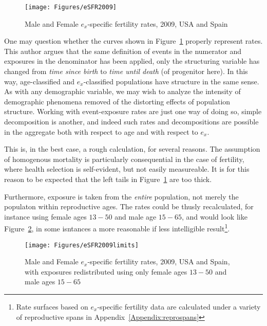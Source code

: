 \begin{figure}[ht!]
        \centering  
          \caption{Male and Female $e_x$-specific fertility rates, 2009, USA and
          Spain}
           \texttt{[image: Figures/eSFR2009]}
          \label{fig:eSFR2009}
\end{figure}

One may question whether the curves shown in Figure~\ref{fig:eSFR2009} properly
represent rates. This author argues that the same definition of events in the
numerator and exposures in the denominator has been applied, only the
structuring variable has changed from \textit{time since birth} to \textit{time
until death} (of progenitor here). In this way, age-classified and
$e_x$-classified populations have structure in the same sense. As with any
demographic variable, we may wish to analyze the intensity of demographic
phenomena removed of the distorting effects of population structure.
Working with event-exposure rates are just one way of doing so, simple
decomposition is another, and indeed such rates and decompositions are possible
in the aggregate both with respect to age and with respect to
$e_x$.

This is, in the best case, a rough calculation, for several reasons. The
assumption of homogenous mortality is particularly consequential in the case of 
fertility, where health selection is self-evident, but not easily measureable.
It is for this reason to be expected that the left tails in
Figure~\ref{fig:eSFR2009} are too thick. 

Furthermore, exposure is taken from the \textit{entire} population, not merely
the populaton within reproductive ages. The rates could be thusly recalculated,
for instance using female ages $13-50$ and male age $15-65$, and would look like 
Figure~\ref{fig:eSFR2009limits}, in some isntances a more reasonable if less
intelligible result\footnote{Rate surfaces based on $e_x$-specific fertility
data are calculated under a variety of reproductive spans in
Appendix~\ref{Appendix:reprospans}}.

\begin{figure}[ht!]
        \centering  
          \caption{Male and Female $e_x$-specific fertility rates, 2009, USA and
          Spain, with exposures redistributed using only female ages $13-50$ and
          male ages $15-65$}
          \texttt{[image: Figures/eSFR2009limits]}
          \label{fig:eSFR2009limits}
\end{figure}

